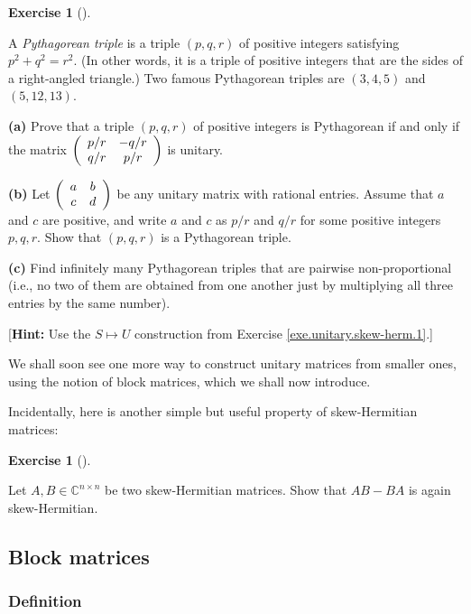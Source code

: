 \documentclass[numbers=enddot,12pt,final,onecolumn,notitlepage]{scrartcl}%
\newcounter{exer}
\numberwithin{exer}{subsection}
\theoremstyle{definition}
\newtheorem{exmp}[exer]{Exercise}
\newenvironment{exercise}[1][]
{\begin{exmp}[#1]\begin{leftbar}}
{\end{leftbar}\end{exmp}}
\begin{document}
\begin{exercise}
\label{exe.unitary.skew-herm.pyth} A \emph{Pythagorean triple} is a
triple $\left(  p,q,r\right)  $ of positive integers satisfying $p^{2}%
+q^{2}=r^{2}$. (In other words, it is a triple of positive integers that are
the sides of a right-angled triangle.) Two famous Pythagorean triples are
$\left(  3,4,5\right)  $ and $\left(  5,12,13\right)  $. \medskip

\textbf{(a)} Prove that a triple $\left(  p,q,r\right)  $ of positive integers
is Pythagorean if and only if the matrix $\left(
\begin{array}
[c]{cc}%
p/r & -q/r\\
q/r & p/r
\end{array}
\right)  $ is unitary. \medskip

\textbf{(b)} Let $\left(
\begin{array}
[c]{cc}%
a & b\\
c & d
\end{array}
\right)  $ be any unitary matrix with rational entries. Assume that $a$ and
$c$ are positive, and write $a$ and $c$ as $p/r$ and $q/r$ for some positive
integers $p,q,r$. Show that $\left(  p,q,r\right)  $ is a Pythagorean triple.
\medskip

\textbf{(c)} Find infinitely many Pythagorean triples that are pairwise
non-proportional (i.e., no two of them are obtained from one another just by
multiplying all three entries by the same number). \medskip

[\textbf{Hint:} Use the $S\mapsto U$ construction from Exercise
\ref{exe.unitary.skew-herm.1}.]
\end{exercise}

We shall soon see one more way to construct unitary matrices from smaller
ones, using the notion of block matrices, which we shall now introduce.

Incidentally, here is another simple but useful property of skew-Hermitian matrices:

\begin{exercise}
 Let $A,B\in\mathbb{C}^{n\times n}$ be two skew-Hermitian matrices.
Show that $AB-BA$ is again skew-Hermitian.
\end{exercise}

\subsection{Block matrices}

\subsubsection{Definition}
\end{document}
